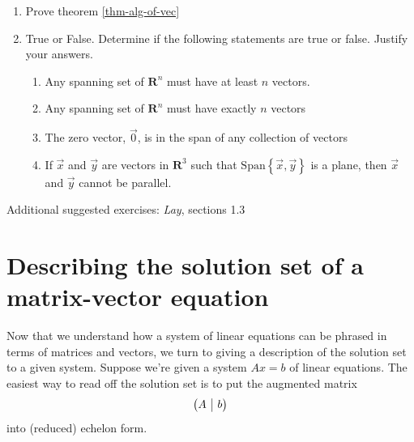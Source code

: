 \documentclass[12pt]{article}
\makeatletter
\numberwithin{equation}{subsection}
\numberwithin{figure}{subsection}
\theoremstyle{note}
\newcommand\Span[1]{\mathrm{Span}\left\{#1\right\}}
\newenvironment{amatrix}[1]{%
  \left(\begin{array}{@{}*{#1}{c}|c@{}}
}{%
  \end{array}\right)
}
\makeatother
\begin{document}
\begin{enumerate}[label=\arabic*.]
	\item Prove theorem \ref{thm-alg-of-vec} 
	\item True or False.  Determine if the following statements are true or false. Justify your answers.
	\begin{enumerate}
		\item Any spanning set of $\mathbf{R}^n$ must have at least $n$ vectors. 
		\item Any spanning set of $\mathbf{R}^n$ must have exactly $n$ vectors
		\item The zero vector, $\vec{0}$, is in the span of any collection of vectors
		\item If $\vec{x}$ and $\vec{y}$ are vectors in $\mathbf{R}^3$ such that $\Span{\vec{x},\vec{y}}$ is a plane, then $\vec{x}$ and $\vec{y}$ cannot be parallel.
		
	\end{enumerate}
	
	
\end{enumerate}
Additional suggested exercises: \textit{Lay}, sections 1.3



\section[Homogeneous systems]{Describing the solution set of a matrix-vector equation} \label{sec-hom} 
Now that we understand how a system of linear equations can be phrased in terms of matrices and vectors, we turn to giving a description of the solution set to a given system. Suppose we're given a system $Ax=b$ of linear equations. The easiest way to read off the solution set is to put the augmented matrix \[ \begin{amatrix}{1} A & b \end{amatrix}\] into (reduced) echelon form.
\end{document}
